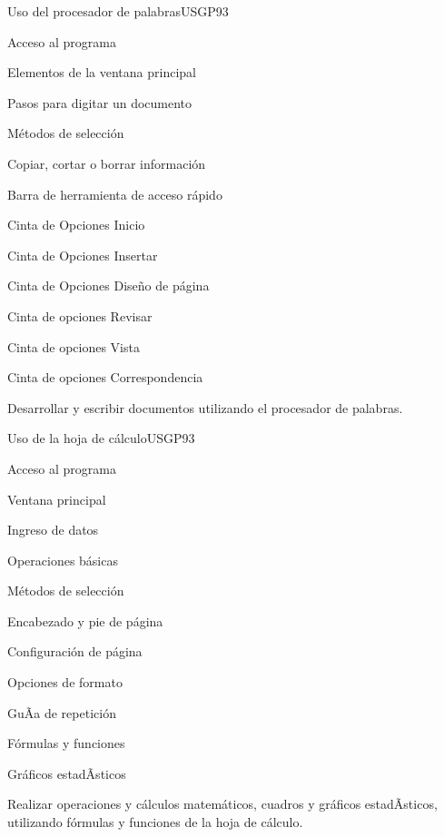 \begin{syllabus}
\begin{unit}{Uso del procesador de palabras}{USGP}{9}{3}
\begin{topics}
      \item Acceso al programa
      \item Elementos de la ventana principal
      \item Pasos para digitar un documento
      \item Métodos de selección
      \item Copiar, cortar o borrar información
      \item Barra de herramienta de acceso rápido
      \item Cinta de Opciones Inicio
      \item Cinta de Opciones Insertar
      \item Cinta de Opciones Diseño de página
      \item Cinta de opciones Revisar
      \item Cinta de opciones Vista
      \item Cinta de opciones Correspondencia
\end{topics}
\begin{unitgoals}
   \item Desarrollar y escribir documentos utilizando el procesador de palabras.
\end{unitgoals}
\end{unit}

\begin{unit}{Uso de la hoja de cálculo}{USGP}{9}{3}
\begin{topics}
      \item Acceso al programa
      \item Ventana principal
      \item Ingreso de datos 
      \item Operaciones básicas 
      \item Métodos de selección 
      \item Encabezado y pie de página 
      \item Configuración de página 
      \item Opciones de formato 
      \item GuÃ­a de repetición
      \item Fórmulas y funciones 
      \item Gráficos estadÃ­sticos
\end{topics}
\begin{unitgoals}
   \item Realizar operaciones y cálculos matemáticos, cuadros y gráficos estadÃ­sticos, utilizando fórmulas y funciones de la hoja de cálculo.
\end{unitgoals}
\end{unit}


\end{syllabus}
